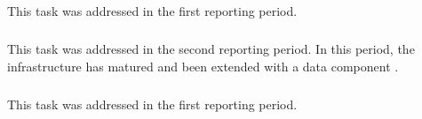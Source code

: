 \subparagraph{}
\label{dksbases@data-foundationCAS}
This task was addressed in the first reporting period. 
%
%
\medskip

\subparagraph{}
\label{dksbases@data-research-categories}
This task was addressed in the second reporting period. In this period, the infrastructure has matured and been extended with a data component \dmh.
\medskip

\subparagraph{}
\label{dksbases@data-OEIS}
This task was addressed in the first reporting period.
\medskip

